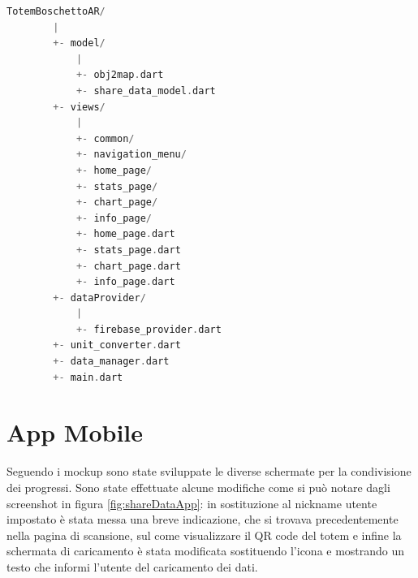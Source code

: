 \begin{lstlisting}[language=C, caption={Albero della directory del progetto TotemBoschettoAR}, label={lst:projectDir}]
    TotemBoschettoAR/
        |
        +- model/
            |
            +- obj2map.dart
            +- share_data_model.dart
        +- views/
            |
            +- common/
            +- navigation_menu/
            +- home_page/
            +- stats_page/
            +- chart_page/
            +- info_page/
            +- home_page.dart
            +- stats_page.dart
            +- chart_page.dart
            +- info_page.dart
        +- dataProvider/
            |
            +- firebase_provider.dart
        +- unit_converter.dart
        +- data_manager.dart
        +- main.dart
\end{lstlisting}

\section{App Mobile}
Seguendo i mockup sono state sviluppate le diverse schermate per la condivisione dei progressi. Sono state effettuate alcune modifiche come si può notare dagli screenshot in figura \ref{fig:shareDataApp}: in sostituzione al nickname utente impostato è stata messa una breve indicazione, che si trovava precedentemente nella pagina di scansione, sul come visualizzare il QR code del totem e infine la schermata di caricamento è stata modificata sostituendo l'icona e mostrando un testo che informi l'utente del caricamento dei dati.
